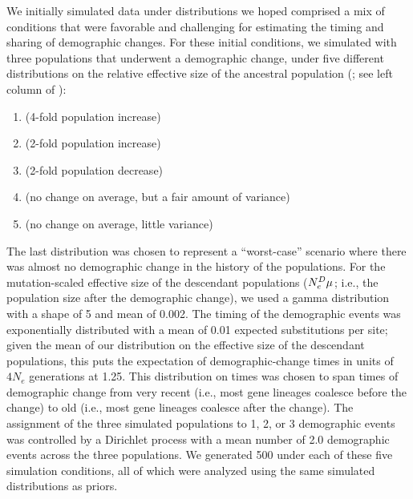 We initially simulated data under distributions we hoped comprised a mix of
conditions that were favorable and challenging for estimating the timing and
sharing of demographic changes.
For these initial conditions, we simulated \datasets with three populations
that underwent a demographic change, under five different distributions on the
relative effective size of the ancestral population
(\rootrelativepopsize; see left column of
\figs
{}):
\begin{enumerate}[label=A.\arabic*]
    \item {} (4-fold population increase) \label{sims:initialFourFoldIncrease}
    \item {} (2-fold population increase)  \label{sims:initialTwoFoldIncrease}
    \item {} (2-fold population decrease)    \label{sims:initialTwoFoldDecrease}
    \item {} (no change on average, but a fair amount of variance) \label{sims:initialCenter}
    \item {} (no change on average, little variance) \label{sims:initialCenterNarrow}
\end{enumerate}
The last distribution was chosen to represent a ``worst-case'' scenario where
there was almost no demographic change in the history of the populations.
For the mutation-scaled effective size of the descendant populations
($\epopsize[\descendantpopindex{}]\murate$; i.e., the population size after the
demographic change),
we used a gamma distribution with a shape of 5 and mean of 0.002.
The timing of the demographic events was exponentially distributed with a mean
of 0.01 expected substitutions per site;
given the mean of our distribution on the effective size of the descendant
populations, this puts the expectation of demographic-change times in units of
$4N_e$ generations at 1.25.
This distribution on times was chosen to span times of demographic change from
very recent (i.e., most gene lineages coalesce before the change) to old (i.e.,
most gene lineages coalesce after the change).
The assignment of the three simulated populations to 1, 2, or 3 demographic
events was controlled by a Dirichlet process with a mean number of 2.0
demographic events across the three populations.
We generated 500 \datasets under each of these five simulation conditions, all
of which were analyzed using the same simulated distributions as priors.

